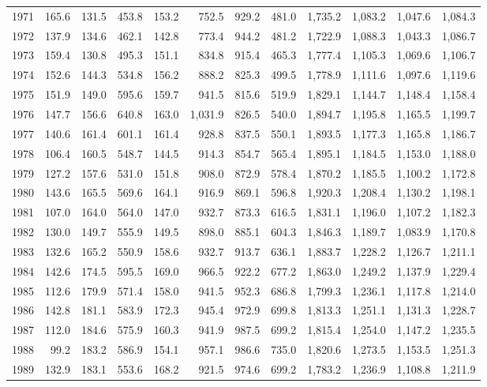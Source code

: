 \begin{longtable}{rrrrrrrrrrrr}
1971 & 165.6 & 131.5 & 453.8 & 153.2 & 752.5 & 929.2 & 481.0 & 1,735.2 & 1,083.2 & 1,047.6 & 1,084.3 \\
1972 & 137.9 & 134.6 & 462.1 & 142.8 & 773.4 & 944.2 & 481.2 & 1,722.9 & 1,088.3 & 1,043.3 & 1,086.7 \\
1973 & 159.4 & 130.8 & 495.3 & 151.1 & 834.8 & 915.4 & 465.3 & 1,777.4 & 1,105.3 & 1,069.6 & 1,106.7 \\
1974 & 152.6 & 144.3 & 534.8 & 156.2 & 888.2 & 825.3 & 499.5 & 1,778.9 & 1,111.6 & 1,097.6 & 1,119.6 \\
1975 & 151.9 & 149.0 & 595.6 & 159.7 & 941.5 & 815.6 & 519.9 & 1,829.1 & 1,144.7 & 1,148.4 & 1,158.4 \\
1976 & 147.7 & 156.6 & 640.8 & 163.0 & 1,031.9 & 826.5 & 540.0 & 1,894.7 & 1,195.8 & 1,165.5 & 1,199.7 \\
1977 & 140.6 & 161.4 & 601.1 & 161.4 & 928.8 & 837.5 & 550.1 & 1,893.5 & 1,177.3 & 1,165.8 & 1,186.7 \\
1978 & 106.4 & 160.5 & 548.7 & 144.5 & 914.3 & 854.7 & 565.4 & 1,895.1 & 1,184.5 & 1,153.0 & 1,188.0 \\
1979 & 127.2 & 157.6 & 531.0 & 151.8 & 908.0 & 872.9 & 578.4 & 1,870.2 & 1,185.5 & 1,100.2 & 1,172.8 \\
1980 & 143.6 & 165.5 & 569.6 & 164.1 & 916.9 & 869.1 & 596.8 & 1,920.3 & 1,208.4 & 1,130.2 & 1,198.1 \\
1981 & 107.0 & 164.0 & 564.0 & 147.0 & 932.7 & 873.3 & 616.5 & 1,831.1 & 1,196.0 & 1,107.2 & 1,182.3 \\
1982 & 130.0 & 149.7 & 555.9 & 149.5 & 898.0 & 885.1 & 604.3 & 1,846.3 & 1,189.7 & 1,083.9 & 1,170.8 \\
1983 & 132.6 & 165.2 & 550.9 & 158.6 & 932.7 & 913.7 & 636.1 & 1,883.7 & 1,228.2 & 1,126.7 & 1,211.1 \\
1984 & 142.6 & 174.5 & 595.5 & 169.0 & 966.5 & 922.2 & 677.2 & 1,863.0 & 1,249.2 & 1,137.9 & 1,229.4 \\
1985 & 112.6 & 179.9 & 571.4 & 158.0 & 941.5 & 952.3 & 686.8 & 1,799.3 & 1,236.1 & 1,117.8 & 1,214.0 \\
1986 & 142.8 & 181.1 & 583.9 & 172.3 & 945.4 & 972.9 & 699.8 & 1,813.3 & 1,251.1 & 1,131.3 & 1,228.7 \\
1987 & 112.0 & 184.6 & 575.9 & 160.3 & 941.9 & 987.5 & 699.2 & 1,815.4 & 1,254.0 & 1,147.2 & 1,235.5 \\
1988 & 99.2 & 183.2 & 586.9 & 154.1 & 957.1 & 986.6 & 735.0 & 1,820.6 & 1,273.5 & 1,153.5 & 1,251.3 \\
1989 & 132.9 & 183.1 & 553.6 & 168.2 & 921.5 & 974.6 & 699.2 & 1,783.2 & 1,236.9 & 1,108.8 & 1,211.9 \\

\end{longtable}
